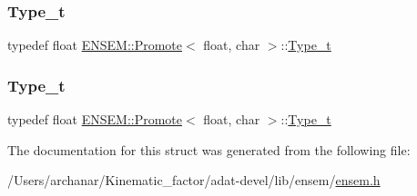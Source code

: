 \mbox{\label{structENSEM_1_1Promote_3_01float_00_01char_01_4_a6bd3d2b4d1e7c3dca5835b3bcaa5be9f}} 
\subsubsection{\texorpdfstring{Type\_t}{Type\_t}\hspace{0.1cm}{\footnotesize\ttfamily [2/3]}}
{\footnotesize\ttfamily typedef float \mbox{\hyperlink{structENSEM_1_1Promote}{E\+N\+S\+E\+M\+::\+Promote}}$<$ float, char $>$\+::\mbox{\hyperlink{structENSEM_1_1Promote_3_01float_00_01char_01_4_a6bd3d2b4d1e7c3dca5835b3bcaa5be9f}{Type\+\_\+t}}}

\mbox{\label{structENSEM_1_1Promote_3_01float_00_01char_01_4_a6bd3d2b4d1e7c3dca5835b3bcaa5be9f}} 
\subsubsection{\texorpdfstring{Type\_t}{Type\_t}\hspace{0.1cm}{\footnotesize\ttfamily [3/3]}}
{\footnotesize\ttfamily typedef float \mbox{\hyperlink{structENSEM_1_1Promote}{E\+N\+S\+E\+M\+::\+Promote}}$<$ float, char $>$\+::\mbox{\hyperlink{structENSEM_1_1Promote_3_01float_00_01char_01_4_a6bd3d2b4d1e7c3dca5835b3bcaa5be9f}{Type\+\_\+t}}}



The documentation for this struct was generated from the following file\+:\begin{DoxyCompactItemize}
\item 
/\+Users/archanar/\+Kinematic\+\_\+factor/adat-\/devel/lib/ensem/\mbox{\hyperlink{adat-devel_2lib_2ensem_2ensem_8h}{ensem.\+h}}\end{DoxyCompactItemize}
